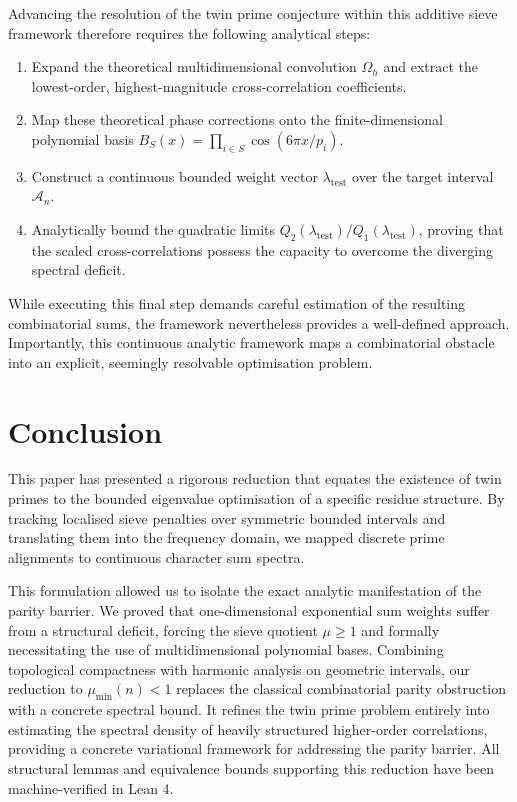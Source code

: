 \documentclass[10pt,twoside]{article}
\theoremstyle{cpctheorem}
\theoremstyle{cpcremark}
\begin{document}
Advancing the resolution of the twin prime conjecture within this additive sieve framework therefore
requires the following analytical steps:
\begin{sloppypar}
\begin{enumerate}
    \item Expand the theoretical multidimensional convolution $\Omega_h$ and extract the lowest-order,
    highest-magnitude cross-correlation coefficients.
    \item Map these theoretical phase corrections onto the finite-dimensional polynomial basis
    ${B_S(x) = \prod_{i \in S} \cos(6\pi x/p_i)}$.
    \item Construct a continuous bounded weight vector $\lambda_{\mathrm{test}}$ over the target
    interval $\mathcal{A}_n$.
    \item Analytically bound the quadratic limits $Q_2(\lambda_{\mathrm{test}}) / Q_1(\lambda_{\mathrm{test}})$, proving
    that the scaled cross-correlations possess the capacity to overcome the diverging
    spectral deficit.
\end{enumerate}
\end{sloppypar}

While executing this final step demands careful estimation of the resulting combinatorial sums, the
framework nevertheless provides a well-defined approach. Importantly, this continuous analytic
framework maps a combinatorial obstacle into an explicit, seemingly resolvable optimisation problem.

\section{Conclusion} \label{sec:conclusion}

This paper has presented a rigorous reduction that equates the existence of twin primes to
the bounded eigenvalue optimisation of a specific residue structure. By tracking localised sieve
penalties over symmetric bounded intervals and translating them into the frequency domain, we
mapped discrete prime alignments to continuous character sum spectra. 

This formulation allowed us to isolate the exact analytic manifestation of the parity barrier. We
proved that one-dimensional exponential sum weights suffer from a structural deficit, forcing the
sieve quotient $\mu \ge 1$ and formally necessitating the use of multidimensional polynomial bases.
Combining topological compactness with harmonic analysis on geometric intervals, our reduction to
$\mu_{\min}(n) < 1$ replaces the classical combinatorial parity obstruction with a concrete spectral
bound. It refines the twin prime problem entirely into estimating the spectral density of heavily
structured higher-order correlations, providing a concrete variational framework for addressing the
parity barrier. All structural lemmas and equivalence bounds supporting this reduction have been
machine-verified in Lean 4.
\end{document}
